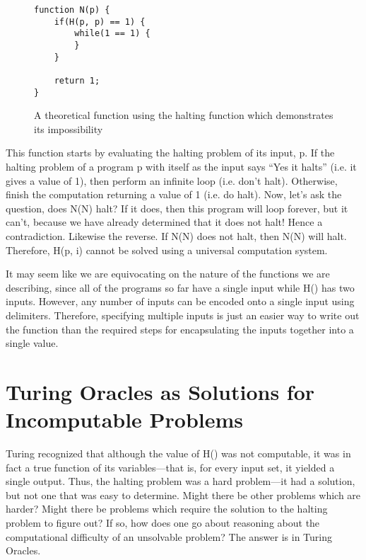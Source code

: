 \begin{figure}[H]
\begin{mdframed}
\begin{verbatim}
function N(p) {
	if(H(p, p) == 1) {
		while(1 == 1) {
		}
	}

	return 1;
}
\end{verbatim}
\end{mdframed}
\caption{A theoretical function using the halting function which demonstrates its impossibility}
\end{figure}

This function starts by evaluating the halting problem of its input, p.  If the halting problem of a program p with itself as the input says ``Yes it halts'' (i.e. it gives a value of 1), then perform an infinite loop (i.e. don't halt).  Otherwise, finish the computation returning a value of 1 (i.e. do halt).  Now, let's ask the question, does N(N) halt?  If it does, then this program will loop forever, but it can't, because we have already determined that it does not halt!  Hence a contradiction.  Likewise the reverse.  If N(N) does not halt, then N(N) will halt. Therefore, H(p, i) cannot be solved using a universal computation system.

It may seem like we are equivocating on the nature of the functions we are describing, since all of the programs so far have a single input while H() has two inputs.  However, any number of inputs can be encoded onto a single input using delimiters.  Therefore, specifying multiple inputs is just an easier way to write out the function than the required steps for encapsulating the inputs together into a single value.

\section[Turing Oracles as Solutions]{Turing Oracles as Solutions for Incomputable Problems}

Turing recognized that although the value of H() was not computable, it was in fact a true function of its variables---that is, for every input set, it yielded a single output.  Thus, the halting problem was a hard problem---it had a solution, but not one that was easy to determine.  Might there be other problems which are harder?  Might there be problems which require the solution to the halting problem to figure out?  If so, how does one go about reasoning about the computational difficulty of an unsolvable problem?  The answer is in Turing Oracles.

